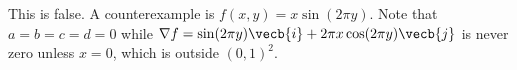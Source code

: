 This is false. A counterexample is $f(x,y)=x\sin(2\pi y)$. Note that $a=b=c=d=0$ while $\nabla f=\sin(2\pi y)\vecb{i}+2\pi x\cos(2\pi y)\vecb{j}$ is never zero unless $x=0$, which is outside $(0,1)^2$.
